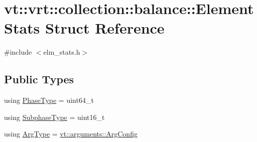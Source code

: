 \hypertarget{structvt_1_1vrt_1_1collection_1_1balance_1_1_element_stats}{}\section{vt\+:\+:vrt\+:\+:collection\+:\+:balance\+:\+:Element\+Stats Struct Reference}
\label{structvt_1_1vrt_1_1collection_1_1balance_1_1_element_stats}


{\ttfamily \#include $<$elm\+\_\+stats.\+h$>$}

\subsection*{Public Types}
\begin{DoxyCompactItemize}
\item 
using \hyperlink{structvt_1_1vrt_1_1collection_1_1balance_1_1_element_stats_a6edee983bb2ae96a341763520af33c66}{Phase\+Type} = uint64\+\_\+t
\item 
using \hyperlink{structvt_1_1vrt_1_1collection_1_1balance_1_1_element_stats_af9ec1f2527b6569a003579f7950db71e}{Subphase\+Type} = uint16\+\_\+t
\item 
using \hyperlink{structvt_1_1vrt_1_1collection_1_1balance_1_1_element_stats_a0c7e7b8fa38003b72320906f18a6ca71}{Arg\+Type} = \hyperlink{structvt_1_1arguments_1_1_arg_config}{vt\+::arguments\+::\+Arg\+Config}
\end{DoxyCompactItemize}
